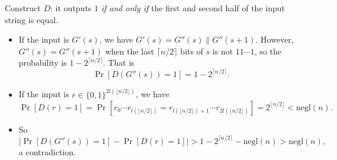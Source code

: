 \documentclass[12pt]{article}
\newcommand{\negl}{\text{negl}}
\newenvironment{problem}[2][Problem]{\begin{trivlist}
\item[\hskip \labelsep {\bfseries #1}\hskip \labelsep {\bfseries #2.}]}{\end{trivlist}}
\begin{document}
\begin{problem}{3.6}
Construct $D$: it outputs $1$ \textit{if and only if} the first and second half of the input string is equal.

\begin{itemize}
    \item If the input is $G'(s)$, we have $G'(s)=G''(s)\|G''(s+1)$. However, $G''(s)=G''(s+1)$ when the last $\lceil n/2\rceil$ bits of $s$ is not $11\cdots1$, so the probability is $1-2^{\lceil n/2\rceil}$. That is \[\Pr[D(G''(s))=1]=1-2^{\lceil n/2\rceil}.\]
    \item If the input is $r\in\{0,1\}^{2l(\lfloor n/2\rfloor)}$, we have 
    \[\Pr[D(r)=1]=\Pr[r_0\cdots r_{l(\lfloor n/2\rfloor)}=r_{l(\lfloor n/2\rfloor)+1}\cdots r_{2l(\lfloor n/2\rfloor)}]=2^{\lfloor n/2\rfloor}<\negl(n).\]
    \item So \[\mid\Pr[D(G''(s))=1]-\Pr[D(r)=1]\mid>1-2^{\lceil n/2\rceil}-\negl(n)>\negl(n),\] a contradiction.
\end{itemize}
\end{problem}
\end{document}
